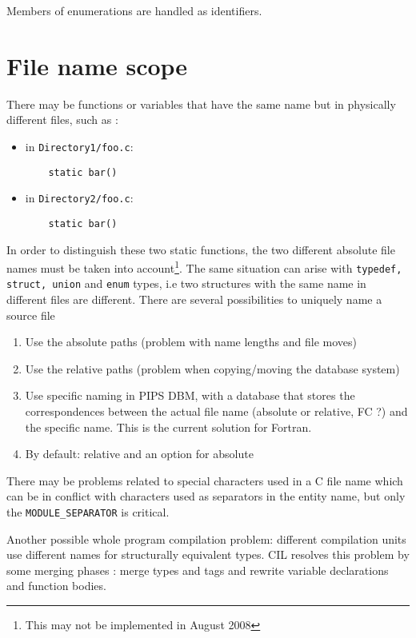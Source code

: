 \documentclass[a4paper]{report}
\begin{document}
Members of enumerations are handled as identifiers.

\section{File name scope}

There may be functions or variables that have the same name but in physically
  different files, such as :

\begin{itemize}
\item in \texttt{Directory1/foo.c}:
  \begin{lstlisting}
    static bar()
  \end{lstlisting}
\item in \texttt{Directory2/foo.c}:
  \begin{lstlisting}
    static bar()
  \end{lstlisting}
\end{itemize}

In order to distinguish these two static functions, the two different
absolute file names must be taken into account\footnote{This may not
  be implemented in August 2008}. The same situation can arise with
\verb/typedef, struct, union/ and \verb/enum/ types, i.e two
structures with the same name in different files are different.  There
are several possibilities to uniquely name a source file
\begin{enumerate}
\item Use the absolute paths (problem with name lengths and file moves)
\item Use the relative paths (problem when copying/moving the
  database system)
\item Use specific naming in PIPS DBM, with a database that stores the
  correspondences between the actual file name (absolute or relative, FC
  ?) and the specific name. This is the current solution for Fortran.
\item By default: relative and an option for absolute 
\end{enumerate}
There may be problems related to special characters used in a C file
name which can be in conflict with characters used as separators in
the entity name, but only the \verb/MODULE_SEPARATOR/ is critical.

Another possible whole program compilation problem: different
compilation units use different names for structurally equivalent
types. CIL \cite{Necu02} resolves this problem by some merging phases
: merge types and tags and rewrite variable declarations and function
bodies.
\end{document}
